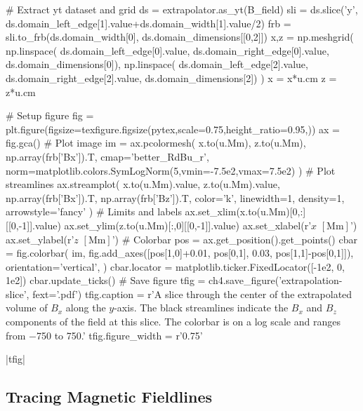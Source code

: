 \begin{pycode}[chapter4]
# Extract yt dataset and grid
ds = extrapolator.as_yt(B_field)
sli = ds.slice('y', ds.domain_left_edge[1].value+ds.domain_width[1].value/2)
frb = sli.to_frb(ds.domain_width[0], ds.domain_dimensions[[0,2]])
x,z = np.meshgrid(
    np.linspace(
        ds.domain_left_edge[0].value,
        ds.domain_right_edge[0].value,
        ds.domain_dimensions[0]),
    np.linspace(
        ds.domain_left_edge[2].value,
        ds.domain_right_edge[2].value,
        ds.domain_dimensions[2])
)
x = x*u.cm
z = z*u.cm

# Setup figure
fig = plt.figure(figsize=texfigure.figsize(pytex,scale=0.75,height_ratio=0.95,))
ax = fig.gca()
# Plot image
im = ax.pcolormesh(
    x.to(u.Mm), z.to(u.Mm),
    np.array(frb['Bx']).T,
    cmap='better_RdBu_r',
    norm=matplotlib.colors.SymLogNorm(5,vmin=-7.5e2,vmax=7.5e2)
)
# Plot streamlines
ax.streamplot(
    x.to(u.Mm).value, z.to(u.Mm).value,
    np.array(frb['Bx']).T, np.array(frb['Bz']).T,
    color='k', linewidth=1, density=1, arrowstyle='fancy'
)
# Limits and labels
ax.set_xlim(x.to(u.Mm)[0,:][[0,-1]].value)
ax.set_ylim(z.to(u.Mm)[:,0][[0,-1]].value)
ax.set_xlabel(r'$x$ $[\si{\mega\m}]$')
ax.set_ylabel(r'$z$ $[\si{\mega\m}]$')
# Colorbar
pos = ax.get_position().get_points()
cbar = fig.colorbar(
    im,
    fig.add_axes([pos[1,0]+0.01, pos[0,1], 0.03, pos[1,1]-pos[0,1]]),
    orientation='vertical',
)
cbar.locator = matplotlib.ticker.FixedLocator([-1e2, 0, 1e2])
cbar.update_ticks()
# Save figure
tfig = ch4.save_figure('extrapolation-slice', fext='.pdf')
tfig.caption = r'A slice through the center of the extrapolated volume of $B_x$ along the $y$-axis. The black streamlines indicate the $B_x$ and $B_z$ components of the field at this slice. The colorbar is on a log scale and ranges from \SI{-750 }{\gauss} to \SI{750 }{\gauss}.'
tfig.figure_width = r'0.75\textwidth'
\end{pycode}
\py[chapter4]|tfig|

\subsection{Tracing Magnetic Fieldlines}\label{sec:trace-fieldlines}

